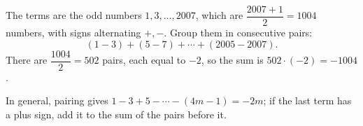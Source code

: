 The terms are the odd numbers $1,3,\dots,2007$, which are $\dfrac{2007+1}{2}=1004$ numbers, with signs alternating $+,-$. Group them in consecutive pairs:
\[
(1-3)+(5-7)+\cdots+(2005-2007).
\]
There are $\dfrac{1004}{2}=502$ pairs, each equal to $-2$, so the sum is $502\cdot(-2)=\boxed{-1004}$.

In general, pairing gives $1-3+5-\cdots-(4m-1)=-2m$; if the last term has a plus sign, add it to the sum of the pairs before it.
